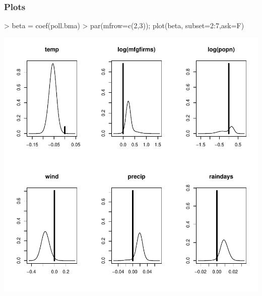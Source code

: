 \documentclass[]{beamer}
\begin{document}
\begin{frame}[fragile]\frametitle{Plots}

\centering
\begin{Schunk}
\begin{Sinput}
>  beta = coef(poll.bma)
>  par(mfrow=c(2,3));  plot(beta, subset=2:7,ask=F)
\end{Sinput}
\end{Schunk}
\includegraphics{17-bma-coef_plot}
\end{frame}
\end{document}
